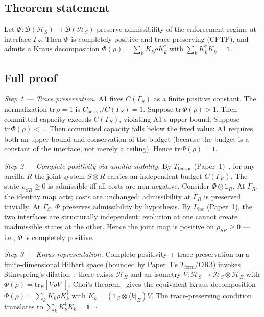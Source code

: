 \documentclass[11pt]{article}
\theoremstyle{remark}
\begin{document}
\subsection{Theorem statement}

\begin{tcolorbox}[apfbox, title={Theorem 2.1 ($T_{\mathrm{CPTP}}$)}]
Let $\Phi: \mathcal{B}(\mathcal{H}_S) \to \mathcal{B}(\mathcal{H}_S)$ preserve
admissibility of the enforcement regime at interface $\Gamma_S$.  Then $\Phi$
is completely positive and trace-preserving (CPTP), and admits a Kraus
decomposition $\Phi(\rho) = \sum_k K_k\rho K_k^\dagger$ with
$\sum_k K_k^\dagger K_k = \mathbb{1}$.
\end{tcolorbox}

\subsection{Full proof}

\textit{Step 1 --- Trace preservation.}  A1 fixes $C(\Gamma_S)$ as a finite
positive constant.  The normalization $\mathrm{tr}\,\rho = 1$ is
$C_{\mathrm{active}}/C(\Gamma_S) = 1$.  Suppose $\mathrm{tr}\,\Phi(\rho) > 1$.
Then committed capacity exceeds $C(\Gamma_S)$, violating A1's upper bound.
Suppose $\mathrm{tr}\,\Phi(\rho) < 1$.  Then committed capacity falls below
the fixed value; A1 requires both an upper bound and conservation of the
budget (because the budget is a constant of the interface, not merely a
ceiling).  Hence $\mathrm{tr}\,\Phi(\rho) = 1$.

\textit{Step 2 --- Complete positivity via ancilla-stability.}  By
$T_{\mathrm{tensor}}$ (Paper~1)~\cite{Paper1}, for any ancilla $R$ the
joint system $S \otimes R$ carries an independent budget $C(\Gamma_R)$.
The state $\rho_{SR} \geq 0$ is admissible iff all costs are non-negative.
Consider $\Phi \otimes \mathbb{1}_R$.  At $\Gamma_R$, the identity map
acts; costs are unchanged; admissibility at $\Gamma_R$ is preserved
trivially.  At $\Gamma_S$, $\Phi$ preserves admissibility by hypothesis.
By $L_{\mathrm{loc}}$ (Paper~1), the two interfaces are structurally
independent: evolution at one cannot create inadmissible states at the
other.  Hence the joint map is positive on $\rho_{SR} \geq 0$ --- i.e.,
$\Phi$ is completely positive.

\textit{Step 3 --- Kraus representation.}  Complete positivity + trace
preservation on a finite-dimensional Hilbert space (bounded by Paper~1's
$T_{\mathrm{form}}$/OR3) invokes Stinespring's dilation~\cite{Stinespring1955}:
there exists $\mathcal{H}_E$ and an isometry
$V: \mathcal{H}_S \to \mathcal{H}_S \otimes \mathcal{H}_E$ with
$\Phi(\rho) = \mathrm{tr}_E[V\rho V^\dagger]$.  Choi's
theorem~\cite{Choi1975} gives the equivalent Kraus decomposition
$\Phi(\rho) = \sum_k K_k \rho K_k^\dagger$ with $K_k = (\mathbb{1}_S \otimes \langle k|_E) V$.
The trace-preserving condition translates to $\sum_k K_k^\dagger K_k = \mathbb{1}$.
\hfill$\square$
\end{document}
